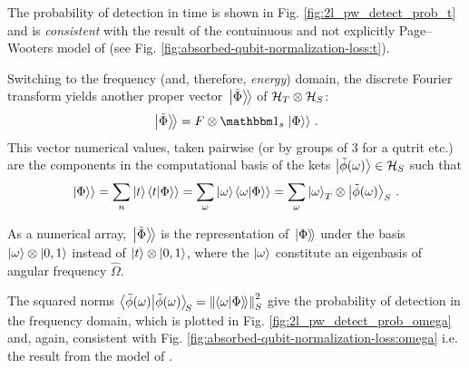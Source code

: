 \citereset
The probability of detection in time is shown in Fig. \ref{fig:2l_pw_detect_prob_t}
and is \emph{consistent} with the result of
the contuinuous and not explicitly Page--Wooters model of
\cite{RuschhauptAbsorption} (see Fig. \ref{fig:absorbed-qubit-normalization-loss:t}).

Switching to the frequency (and, therefore, \emph{energy}) domain,
the discrete Fourier transform yields another proper vector
$\left.\left| \tilde{\Phi} \right\rangle\!\right\rangle$ of $\mathcal{H}_T \otimes \mathcal{H}_S$:
\begin{equation}
  \Dket{\tilde{\Phi}} = F \ox \idop_s \dket{\Phi} \, \text{.}
\end{equation}
This vector numerical values, taken pairwise
(or by groups of 3 for a qutrit etc.)
are the components in the computational basis
of the kets $\ket{\tilde{\phi}(\omega)} \in \mathcal{H}_S$
such that
\begin{equation}
  \left.\left| \Phi \right\rangle\right\rangle = \sum_n \ket{t}\!\left.\left\langle t \middle| \Phi \right\rangle\right\rangle = \sum_{\omega} \ket{\omega}\!\left.\left\langle \omega \middle| \Phi \right\rangle\right\rangle
    = \sum_{\omega} \ket{\omega}_T \otimes \ket{\tilde{\phi}(\omega)}_S \, \text{.}
\end{equation}

As a numerical array, $\left.\left| \tilde{\Phi} \right\rangle\!\right\rangle$ is the representation of $\left.\left| \Phi \right\rangle\!\right\rangle$
under the basis $\ket{\omega} \otimes \ket{0,1}$ instead of $\ket{t} \otimes \ket{0,1}$,
where the $\ket{\omega}$ constitute an eigenbasis of angular frequency $\hat{\Omega}$.

\citereset
The squared norms $\braket{\tilde{\phi}(\omega)}_{\!S} = \norm{\!\left.\left\langle \omega \middle| \Phi \right\rangle\!\right\rangle}_S^2$
give the probability of detection in the frequency domain, which is plotted in
Fig. \ref{fig:2l_pw_detect_prob_omega} and, again, consistent
with Fig. \ref{fig:absorbed-qubit-normalization-loss:omega} i.e.
the result from the model of \cite{RuschhauptAbsorption}.

